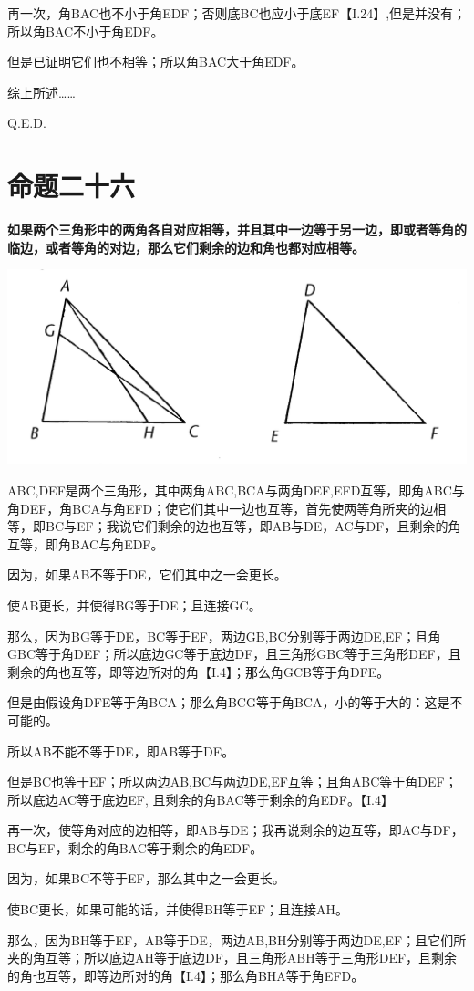 \documentclass[
]{book}
\begin{document}
再一次，角BAC也不小于角EDF；否则底BC也应小于底EF【I.24】,但是并没有；所以角BAC不小于角EDF。

但是已证明它们也不相等；所以角BAC大于角EDF。

综上所述\ldots\ldots{}

Q.E.D.

\hypertarget{ux547dux9898ux4e8cux5341ux516d}{%
\section{命题二十六}\label{ux547dux9898ux4e8cux5341ux516d}}

\textbf{如果两个三角形中的两角各自对应相等，并且其中一边等于另一边，即或者等角的临边，或者等角的对边，那么它们剩余的边和角也都对应相等。}

\includegraphics[width=0.5\linewidth]{./image/img504}

ABC,DEF是两个三角形，其中两角ABC,BCA与两角DEF,EFD互等，即角ABC与角DEF，角BCA与角EFD；使它们其中一边也互等，首先使两等角所夹的边相等，即BC与EF；我说它们剩余的边也互等，即AB与DE，AC与DF，且剩余的角互等，即角BAC与角EDF。

因为，如果AB不等于DE，它们其中之一会更长。

使AB更长，并使得BG等于DE；且连接GC。

那么，因为BG等于DE，BC等于EF，两边GB,BC分别等于两边DE,EF；且角GBC等于角DEF；所以底边GC等于底边DF，且三角形GBC等于三角形DEF，且剩余的角也互等，即等边所对的角【I.4】；那么角GCB等于角DFE。

但是由假设角DFE等于角BCA；那么角BCG等于角BCA，小的等于大的：这是不可能的。

所以AB不能不等于DE，即AB等于DE。

但是BC也等于EF；所以两边AB,BC与两边DE,EF互等；且角ABC等于角DEF；所以底边AC等于底边EF, 且剩余的角BAC等于剩余的角EDF。【I.4】

再一次，使等角对应的边相等，即AB与DE；我再说剩余的边互等，即AC与DF，BC与EF，剩余的角BAC等于剩余的角EDF。

因为，如果BC不等于EF，那么其中之一会更长。

使BC更长，如果可能的话，并使得BH等于EF；且连接AH。

那么，因为BH等于EF，AB等于DE，两边AB,BH分别等于两边DE,EF；且它们所夹的角互等；所以底边AH等于底边DF，且三角形ABH等于三角形DEF，且剩余的角也互等，即等边所对的角【I.4】；那么角BHA等于角EFD。
\end{document}
